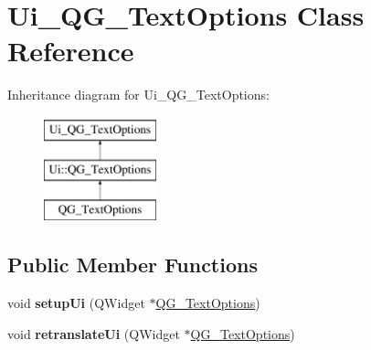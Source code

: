 \hypertarget{classUi__QG__TextOptions}{\section{Ui\-\_\-\-Q\-G\-\_\-\-Text\-Options Class Reference}
\label{classUi__QG__TextOptions}
}
Inheritance diagram for Ui\-\_\-\-Q\-G\-\_\-\-Text\-Options\-:\begin{figure}[H]
\begin{center}
\leavevmode
\includegraphics[height=3.000000cm]{classUi__QG__TextOptions}
\end{center}
\end{figure}
\subsection*{Public Member Functions}
\begin{DoxyCompactItemize}
\item 
\hypertarget{classUi__QG__TextOptions_a674d13919e92601188660b8c23546063}{void {\bfseries setup\-Ui} (Q\-Widget $\ast$\hyperlink{classQG__TextOptions}{Q\-G\-\_\-\-Text\-Options})}\label{classUi__QG__TextOptions_a674d13919e92601188660b8c23546063}

\item 
\hypertarget{classUi__QG__TextOptions_a962420302e431c92ca236a3f2b53de16}{void {\bfseries retranslate\-Ui} (Q\-Widget $\ast$\hyperlink{classQG__TextOptions}{Q\-G\-\_\-\-Text\-Options})}\label{classUi__QG__TextOptions_a962420302e431c92ca236a3f2b53de16}

\end{DoxyCompactItemize}
